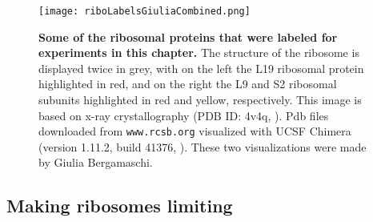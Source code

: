 \begin{figure}
    \centering
    \texttt{[image: riboLabelsGiuliaCombined.png]}
    \caption{ 
        \textbf{Some of the ribosomal proteins that were labeled for experiments in this chapter.}
        The structure of the ribosome is displayed twice in grey, with on the left the L19 ribosomal protein highlighted in red, and on the right the L9 and S2 ribosomal subunits highlighted in red and yellow, respectively.
        This image is based on x-ray crystallography (PDB ID: 4v4q, \cite{Schuwirth2005}). Pdb files downloaded from \texttt{www.rcsb.org} \cite{Berman2000} 
        visualized with UCSF Chimera (version 1.11.2, build 41376, \cite{pettersen2004}). These two visualizations were made by Giulia Bergamaschi.
    }
    \label{fig:ribo:labelsPicGiulia}
\end{figure}


\subsection{Making ribosomes limiting}



